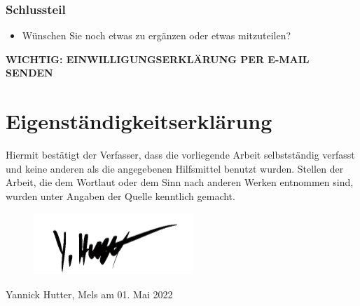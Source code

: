 \documentclass[12pt, oneside]{article}
\begin{document}
\subsubsection*{Schlussteil}
\begin{itemize}
    \item Wünschen Sie noch etwas zu ergänzen oder etwas mitzuteilen?
\end{itemize}

\textbf{WICHTIG: EINWILLIGUNGSERKLÄRUNG PER E-MAIL SENDEN}

\clearpage
\section*{Eigenständigkeitserklärung}
Hiermit bestätigt der Verfasser, dass die vorliegende Arbeit selbstständig verfasst und keine anderen als die angegebenen Hilfsmittel benutzt wurden. Stellen der Arbeit, die dem Wortlaut oder dem Sinn nach anderen Werken entnommen sind, wurden unter Angaben der Quelle kenntlich gemacht.

\begin{figure}[ht]
	\includegraphics[width=6cm]{images/signature.png}
\end{figure}
Yannick Hutter, Mels am 01. Mai 2022
\end{document}
